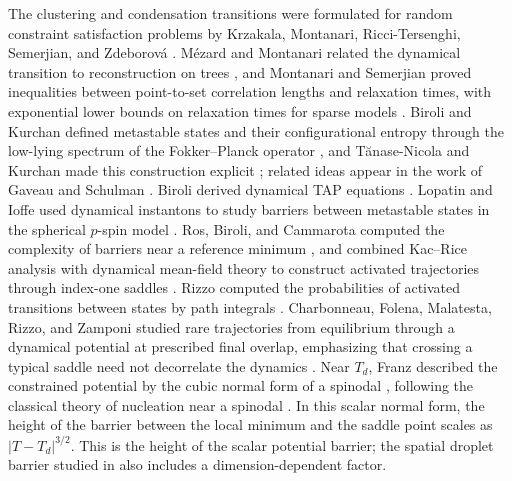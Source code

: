 The clustering and condensation transitions were formulated for random constraint satisfaction problems by Krzakala, Montanari, Ricci-Tersenghi, Semerjian, and Zdeborov\'a \cite{KrzakalaMontanariRicciTersenghiSemerjianZdeborova2007}. M\'ezard and Montanari related the dynamical transition to reconstruction on trees \cite{MezardMontanari2006}, and Montanari and Semerjian proved inequalities between point-to-set correlation lengths and relaxation times, with exponential lower bounds on relaxation times for sparse models \cite{MontanariSemerjian2006}. Biroli and Kurchan defined metastable states and their configurational entropy through the low-lying spectrum of the Fokker--Planck operator \cite{BiroliKurchan2001}, and T\u{a}nase-Nicola and Kurchan made this construction explicit \cite{TanaseNicolaKurchan2004}; related ideas appear in the work of Gaveau and Schulman \cite{GaveauSchulman1998}. Biroli derived dynamical TAP equations \cite{Biroli1999}. Lopatin and Ioffe used dynamical instantons to study barriers between metastable states in the spherical $p$-spin model \cite{LopatinIoffe2000}. Ros, Biroli, and Cammarota computed the complexity of barriers near a reference minimum \cite{RosBiroliCammarota2019}, and combined Kac--Rice analysis with dynamical mean-field theory to construct activated trajectories through index-one saddles \cite{RosBiroliCammarota2021}. Rizzo computed the probabilities of activated transitions between states by path integrals \cite{Rizzo2021}. Charbonneau, Folena, Malatesta, Rizzo, and Zamponi studied rare trajectories from equilibrium through a dynamical potential at prescribed final overlap, emphasizing that crossing a typical saddle need not decorrelate the dynamics \cite{CharbonneauFolenaMalatestaRizzoZamponi2026}. Near $T_d$, Franz described the constrained potential by the cubic normal form of a spinodal \cite[Section~5.2.1]{Franz2005}, following the classical theory of nucleation near a spinodal \cite{UngerKlein1984}. In this scalar normal form, the height of the barrier between the local minimum and the saddle point scales as $|T-T_d|^{3/2}$. This is the height of the scalar potential barrier; the spatial droplet barrier studied in \cite[Section~5.2.1]{Franz2005} also includes a dimension-dependent factor.

